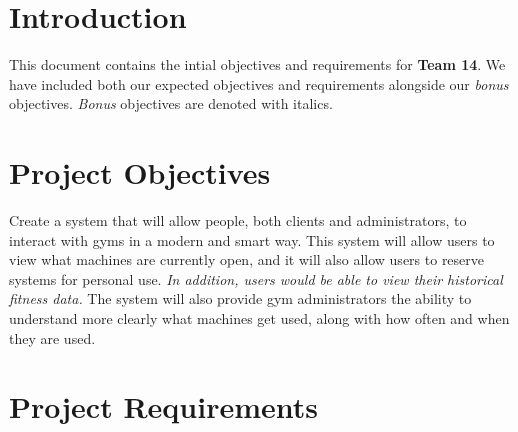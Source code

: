 \documentclass[letterpaper,11pt]{./templates/texMemo} %
\begin{document}
\maketitle

\section{Introduction}

This document contains the intial objectives and requirements for \textbf{Team 14}. We have included both our expected objectives and requirements alongside our \textit{bonus} objectives. \textit{Bonus} objectives are denoted with italics.  


\section{Project Objectives}

Create a system that will allow people, both clients and administrators, to interact with gyms in a modern and smart way.
This system will allow users to view what machines are currently open, 
    and it will also allow users to reserve systems for personal use. 
\textit{In addition, users would be able to view their historical fitness data.}
The system will also provide gym administrators the ability to understand more clearly what machines get used,
    along with how often and when they are used.

\section{Project Requirements}
\end{document}
